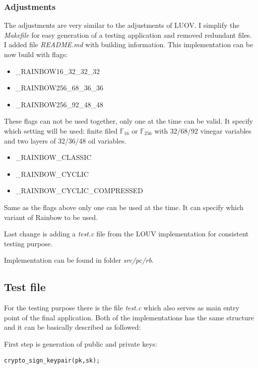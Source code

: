 \documentclass[thesis=M,english]{FITthesis}[2019/12/23]
\begin{document}
\subsubsection{Adjustments}
The adjustments are very similar to the adjustments of LUOV. I simplify the \textit{Makefile} for easy generation of a testing application and removed redundant files. I added file \textit{README.md} with building information. This implementation can be now build with flags:

\begin{itemize}
\item	\_RAINBOW16\_32\_32\_32 
\item	\_RAINBOW256\_68\_36\_36 
\item	\_RAINBOW256\_92\_48\_48 
\end{itemize}
These flags can not be used together, only one at the time can be valid. It specify which setting will be used: finite filed $\mathbb{F}_{16}$ or $\mathbb{F}_{256}$ with 32/68/92 vinegar variables and two layers of 32/36/48 oil variables.

\begin{itemize}
\item	\_RAINBOW\_CLASSIC  
\item	\_RAINBOW\_CYCLIC 
\item	\_RAINBOW\_CYCLIC\_COMPRESSED 
\end{itemize}
Same as the flags above only one can be used at the time. It can specify which variant of Rainbow to be used.

\bigskip
\noindent
Last change is adding a \textit{test.c} file from the LOUV implementation for consistent testing purpose.

\bigskip
\noindent
Implementation can be found in folder \textit{src/pc/rb}.  

\subsection{Test file}
For the testing purpose there is the file \textit{test.c} which also serves as main entry point of the final application. Both of the implementations has the same structure and it can be basically described as followed:

\bigskip
\noindent
First step is generation of public and private keys:
\begin{lstlisting}[frame=single]
crypto_sign_keypair(pk,sk);
\end{lstlisting}
\end{document}
